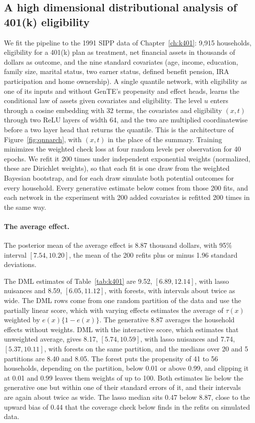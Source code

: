 \subsection{A high dimensional distributional analysis of 401(k) eligibility}

We fit the pipeline to the 1991 SIPP data of Chapter~\ref{ch:k401}: 9{,}915 households, eligibility for a 401(k) plan as treatment, net financial assets in thousands of dollars as outcome, and the nine standard covariates (age, income, education, family size, marital status, two earner status, defined benefit pension, IRA participation and home ownership). A single quantile network, with eligibility as one of its inputs and without GenTE's propensity and effect heads, learns the conditional law of assets given covariates and eligibility. The level $u$ enters through a cosine embedding with 32 terms, the covariates and eligibility $(x, t)$ through two ReLU layers of width 64, and the two are multiplied coordinatewise before a two layer head that returns the quantile. This is the architecture of Figure~\ref{fig:qnnarch}, with $(x, t)$ in the place of the summary. Training minimizes the weighted check loss at four random levels per observation for 40 epochs. We refit it 200 times under independent exponential weights (normalized, these are Dirichlet weights), so that each fit is one draw from the weighted Bayesian bootstrap, and for each draw simulate both potential outcomes for every household. Every generative estimate below comes from those 200 fits, and each network in the experiment with 200 added covariates is refitted 200 times in the same way.

\paragraph{The average effect.} The posterior mean of the average effect is 8.87 thousand dollars, with 95\% interval $[7.54, 10.20]$, the mean of the 200 refits plus or minus 1.96 standard deviations.

The DML estimates of Table~\ref{tab:k401} are 9.52, $[6.89, 12.14]$, with lasso nuisances and 8.59, $[6.05, 11.12]$, with forests, with intervals about twice as wide. The DML rows come from one random partition of the data and use the partially linear score, which with varying effects estimates the average of $\tau(x)$ weighted by $e(x)\{1 - e(x)\}$. The generative 8.87 averages the household effects without weights. DML with the interactive score, which estimates that unweighted average, gives 8.17, $[5.74, 10.59]$, with lasso nuisances and 7.74, $[5.37, 10.11]$, with forests on the same partition, and the medians over 20 and 5 partitions are 8.40 and 8.05. The forest puts the propensity of 41 to 56 households, depending on the partition, below 0.01 or above 0.99, and clipping it at 0.01 and 0.99 leaves them weights of up to 100. Both estimates lie below the generative one but within one of their standard errors of it, and their intervals are again about twice as wide. The lasso median sits 0.47 below 8.87, close to the upward bias of 0.44 that the coverage check below finds in the refits on simulated data.

